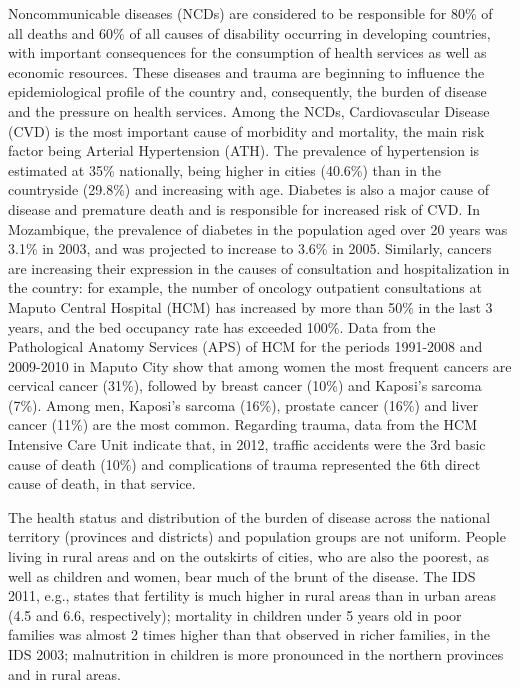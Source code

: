 \documentclass[
]{book}
\begin{document}
Noncommunicable diseases (NCDs) are considered to be responsible for 80\% of all deaths and 60\% of all causes of disability occurring in developing countries, with important consequences for the consumption of health services as well as economic resources. These diseases and trauma are beginning to influence the epidemiological profile of the country and, consequently, the burden of disease and the pressure on health services. Among the NCDs, Cardiovascular Disease (CVD) is the most important cause of morbidity and mortality, the main risk factor being Arterial Hypertension (ATH). The prevalence of hypertension is estimated at 35\% nationally, being higher in cities (40.6\%) than in the countryside (29.8\%) and increasing with age. Diabetes is also a major cause of disease and premature death and is responsible for increased risk of CVD. In Mozambique, the prevalence of diabetes in the population aged over 20 years was 3.1\% in 2003, and was projected to increase to 3.6\% in 2005. Similarly, cancers are increasing their expression in the causes of consultation and hospitalization in the country: for example, the number of oncology outpatient consultations at Maputo Central Hospital (HCM) has increased by more than 50\% in the last 3 years, and the bed occupancy rate has exceeded 100\%. Data from the Pathological Anatomy Services (APS) of HCM for the periods 1991-2008 and 2009-2010 in Maputo City show that among women the most frequent cancers are cervical cancer (31\%), followed by breast cancer (10\%) and Kaposi's sarcoma (7\%). Among men, Kaposi's sarcoma (16\%), prostate cancer (16\%) and liver cancer (11\%) are the most common. Regarding trauma, data from the HCM Intensive Care Unit indicate that, in 2012, traffic accidents were the 3rd basic cause of death (10\%) and complications of trauma represented the 6th direct cause of death, in that service.

The health status and distribution of the burden of disease across the national territory (provinces and districts) and population groups are not uniform. People living in rural areas and on the outskirts of cities, who are also the poorest, as well as children and women, bear much of the brunt of the disease. The IDS 2011, e.g., states that fertility is much higher in rural areas than in urban areas (4.5 and 6.6, respectively); mortality in children under 5 years old in poor families was almost 2 times higher than that observed in richer families, in the IDS 2003; malnutrition in children is more pronounced in the northern provinces and in rural areas.
\end{document}
